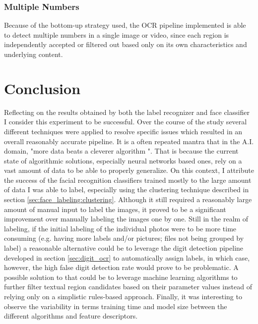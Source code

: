 \documentclass[11pt]{article}
\begin{document}
    \subsubsection{Multiple Numbers}
        Because of the bottom-up strategy used, the OCR pipeline implemented is able to detect multiple numbers in a single image or video, since each region is independently accepted or filtered out based only on its own characteristics and underlying content.

\section{Conclusion}
    Reflecting on the results obtained by both the label recognizer and face classifier I consider this experiment to be successful. Over the course of the study several different techniques were applied to resolve specific issues which resulted in an overall reasonably accurate pipeline. It is a often repeated mantra that in the A.I. domain, "more data beats a cleverer algorithm ". That is because the current state of algorithmic solutions, especially neural networks based ones, rely on a vast amount of data to be able to properly generalize. On this context, I attribute the success of the facial recognition classifiers trained mostly to the large amount of data I was able to label, especially using the clustering technique described in section \ref{sec:face_labeling:clustering}. Although it still required a reasonably large amount of manual input to label the images, it proved to be a significant improvement over manually labeling the images one by one. Still in the realm of labeling, if the initial labeling of the individual photos were to be more time consuming (e.g. having more labels and/or pictures; files not being grouped by label) a reasonable alternative could be to leverage the digit detection pipeline developed in section \ref{sec:digit_ocr} to automatically assign labels, in which case, however, the high false digit detection rate would prove to be problematic. A possible solution to that could be to leverage machine learning algorithms to further filter textual region candidates based on their parameter values instead of relying only on a simplistic rules-based approach. Finally, it was interesting to observe the variability in terms training time and model size between the different algorithms and feature descriptors.
\end{document}
